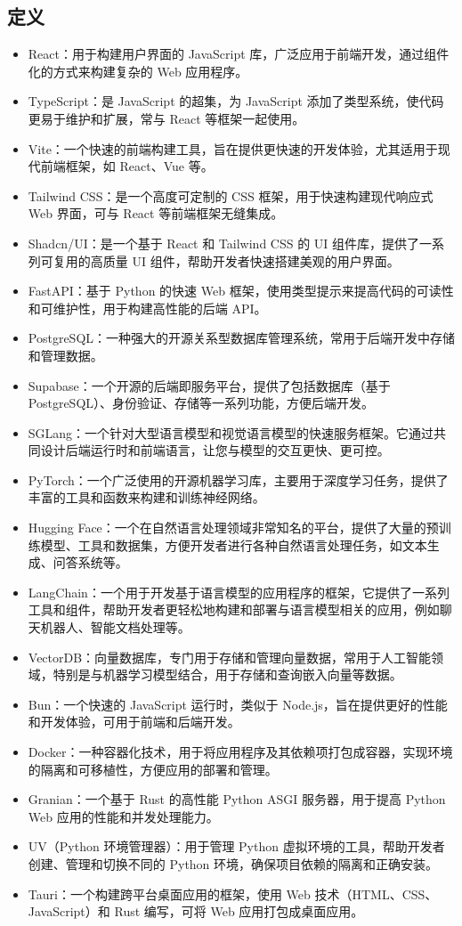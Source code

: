 \documentclass[
    report,     %
    oneside,    %
    UTF8,       %
    zihao=-4    %
]{config} %
\begin{document}
\subsection{定义}
\begin{itemize}[itemsep=2pt,topsep=0.6pt,parsep=0.6pt]
    \item React：用于构建用户界面的 JavaScript 库，广泛应用于前端开发，通过组件化的方式来构建复杂的 Web 应用程序。
    \item TypeScript：是 JavaScript 的超集，为 JavaScript 添加了类型系统，使代码更易于维护和扩展，常与 React 等框架一起使用。
    \item Vite：一个快速的前端构建工具，旨在提供更快速的开发体验，尤其适用于现代前端框架，如 React、Vue 等。
    \item Tailwind CSS：是一个高度可定制的 CSS 框架，用于快速构建现代响应式 Web 界面，可与 React 等前端框架无缝集成。
    \item Shadcn/UI：是一个基于 React 和 Tailwind CSS 的 UI 组件库，提供了一系列可复用的高质量 UI 组件，帮助开发者快速搭建美观的用户界面。
    \item FastAPI：基于 Python 的快速 Web 框架，使用类型提示来提高代码的可读性和可维护性，用于构建高性能的后端 API。
    \item PostgreSQL：一种强大的开源关系型数据库管理系统，常用于后端开发中存储和管理数据。
    \item Supabase：一个开源的后端即服务平台，提供了包括数据库（基于 PostgreSQL）、身份验证、存储等一系列功能，方便后端开发。
    \item SGLang：一个针对大型语言模型和视觉语言模型的快速服务框架。它通过共同设计后端运行时和前端语言，让您与模型的交互更快、更可控。
    \item PyTorch：一个广泛使用的开源机器学习库，主要用于深度学习任务，提供了丰富的工具和函数来构建和训练神经网络。
    \item Hugging Face：一个在自然语言处理领域非常知名的平台，提供了大量的预训练模型、工具和数据集，方便开发者进行各种自然语言处理任务，如文本生成、问答系统等。
    \item LangChain：一个用于开发基于语言模型的应用程序的框架，它提供了一系列工具和组件，帮助开发者更轻松地构建和部署与语言模型相关的应用，例如聊天机器人、智能文档处理等。
    \item VectorDB：向量数据库，专门用于存储和管理向量数据，常用于人工智能领域，特别是与机器学习模型结合，用于存储和查询嵌入向量等数据。
    \item Bun：一个快速的 JavaScript 运行时，类似于 Node.js，旨在提供更好的性能和开发体验，可用于前端和后端开发。
    \item Docker：一种容器化技术，用于将应用程序及其依赖项打包成容器，实现环境的隔离和可移植性，方便应用的部署和管理。
    \item Granian：一个基于 Rust 的高性能 Python ASGI 服务器，用于提高 Python Web 应用的性能和并发处理能力。
    \item UV（Python 环境管理器）：用于管理 Python 虚拟环境的工具，帮助开发者创建、管理和切换不同的 Python 环境，确保项目依赖的隔离和正确安装。
    \item Tauri：一个构建跨平台桌面应用的框架，使用 Web 技术（HTML、CSS、JavaScript）和 Rust 编写，可将 Web 应用打包成桌面应用。
\end{itemize}
\end{document}
